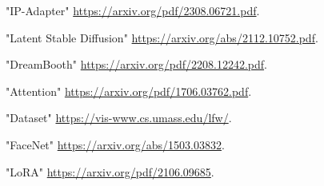 \documentclass{article}
\begin{document}
\begin{thebibliography}{1}
"IP-Adapter" 
\url{https://arxiv.org/pdf/2308.06721.pdf}.

"Latent Stable Diffusion" 
\url{https://arxiv.org/abs/2112.10752.pdf}.

"DreamBooth" 
\url{https://arxiv.org/pdf/2208.12242.pdf}.

"Attention" 
\url{https://arxiv.org/pdf/1706.03762.pdf}.

"Dataset" 
\url{https://vis-www.cs.umass.edu/lfw/}.

"FaceNet" 
\url{https://arxiv.org/abs/1503.03832}.

"LoRA" 
\url{https://arxiv.org/pdf/2106.09685}.

\end{thebibliography}
\end{document}
